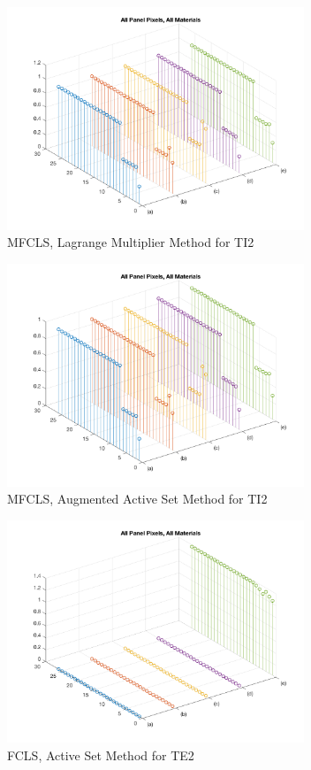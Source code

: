 \documentclass[journal]{IEEEtran}
\begin{document}
\begin{figure}[!h]
    \centering
    \includegraphics[width=3.5in]{mfcls2_ti2_allmaterials.png}
    \caption{MFCLS, Lagrange Multiplier Method for TI2}
    \label{fig:mfcls2_ti2}
\end{figure}

\begin{figure}[!h]
    \centering
    \includegraphics[width=3.5in]{mfcls_ti2_allmaterials.png}
    \caption{MFCLS, Augmented Active Set Method for TI2}
    \label{fig:mfcls_ti2}
\end{figure}

\begin{figure}[!h]
    \centering
    \includegraphics[width=3.5in]{fcls_te2_allmaterials.png}
    \caption{FCLS, Active Set Method for TE2}
    \label{fig:fcls_te2}
\end{figure}
\end{document}
